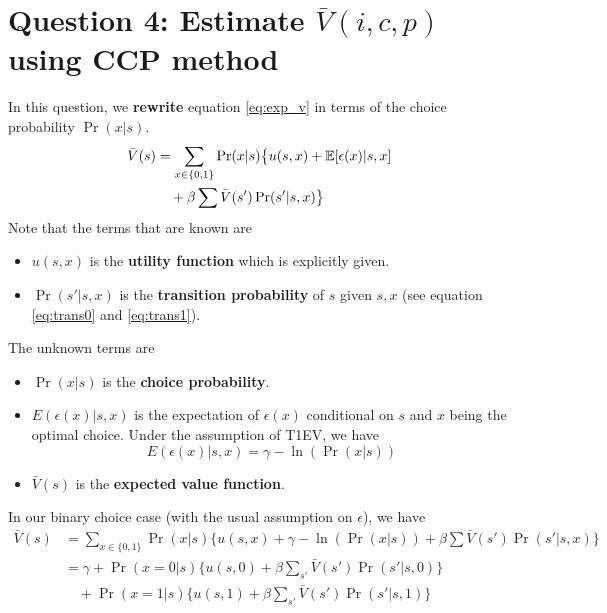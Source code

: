 \documentclass[12pt]{article}[margin=1in]
\begin{document}
\section{Question 4: Estimate $\bar{V}(i,c,p)$ using CCP method}
In this question, we \textbf{rewrite} equation \ref{eq:exp_v} in terms of the choice probability $\Pr(x|s)$.
\begin{equation}
    \begin{split}
        \bar{V}(s) & =\sum_{x \in \{0,1\}} \Pr(x|s) \big\{ u(s,x) + \mathbb{E}[\epsilon(x)|s,x] \\
                   & \quad + \beta \sum \bar{V}(s') \Pr(s'|s,x) \big\}
    \end{split}
\end{equation}
Note that the terms that are known are
\begin{itemize}
    \item $u(s,x)$ is the \textbf{utility function} which is explicitly given.
    \item $\Pr(s'|s,x)$ is the \textbf{transition probability} of $s$ given $s,x$ (see equation \ref{eq:trans0} and \ref{eq:trans1}).
\end{itemize}
The unknown terms are
\begin{itemize}
    \item $\Pr(x|s)$ is the \textbf{choice probability}.
    \item $E(\epsilon(x)|s,x)$ is the expectation of $\epsilon(x)$ conditional on $s$ and $x$ being the optimal choice. Under the assumption of T1EV, we have
          \begin{equation*}
              E(\epsilon(x)|s,x)=\gamma-\ln(\Pr(x|s))
          \end{equation*}
    \item $\bar{V}(s)$ is the \textbf{expected value function}.
\end{itemize}
In our binary choice case (with the usual assumption on $\epsilon$), we have
\begin{equation}\label{eq:exp_v_bin_ccp}
    \begin{split}
        \bar{V}(s) & =\sum_{x \in \{0,1\}} \Pr(x|s) \big\{ u(s,x) + \gamma-\ln(\Pr(x|s)) +\beta \sum \bar{V}(s') \Pr(s'|s,x) \big\} \\
                   & =\gamma + \Pr(x=0|s) \{u(s,0) + \beta \sum_{s'} \bar{V}(s') \Pr(s'|s,0)\}                                      \\
                   & \quad + \Pr(x=1|s) \{u(s,1) + \beta \sum_{s'} \bar{V}(s') \Pr(s'|s,1)\}                                        \\
    \end{split}
\end{equation}
\end{document}
